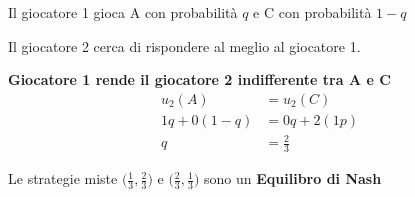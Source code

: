 Il giocatore 1 gioca A con probabilità $q$ e C con probabilità $1-q$

Il giocatore 2 cerca di rispondere al meglio al giocatore 1.

\textbf{Giocatore 1 rende il giocatore 2 indifferente tra A e C}
\begin{equation}
    \begin{aligned}
        u_2(A)      & = u_2(C)      \\
        1q + 0(1-q) & = 0q + 2(1p)  \\
        q           & = \frac{2}{3}
    \end{aligned}
\end{equation}

Le strategie miste $\bigl(\frac{1}{3}, \frac{2}{3}\bigr)$ e $\bigl(\frac{2}{3},
    \frac{1}{3}\bigr)$ sono un \textbf{Equilibro di Nash}

